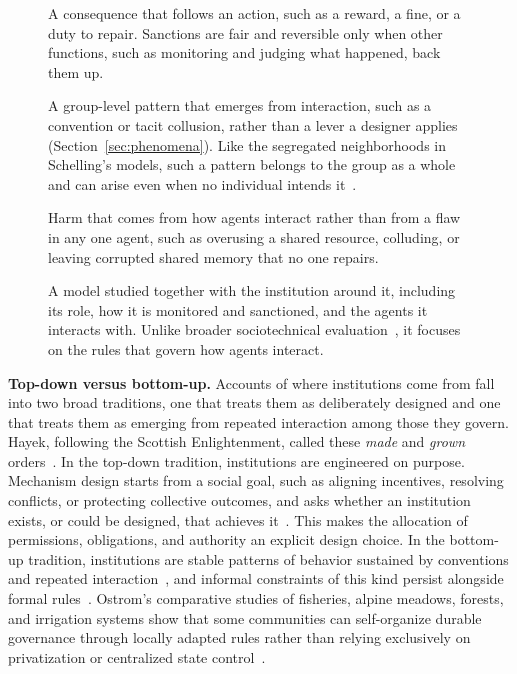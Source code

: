 \documentclass[runningheads]{llncs}
\begin{document}
\begin{figure}[!t]
{\begin{minipage}{0.95\linewidth}
\begin{description}[leftmargin=0pt, itemsep=2pt, topsep=4pt, font=\normalfont\bfseries]
\item[Sanction.] A consequence that follows an action, such as a reward, a fine, or a duty to repair. Sanctions are fair and reversible only when other functions, such as monitoring and judging what happened, back them up.
\item[Phenomenon.] A group-level pattern that emerges from interaction, such as a convention or tacit collusion, rather than a lever a designer applies (Section~\mbox{\ref{sec:phenomena}}). Like the segregated neighborhoods in Schelling's models, such a pattern belongs to the group as a whole and can arise even when no individual intends it~\mbox{\citep{schelling1978micromotives}}.
\item[Interaction failure.] Harm that comes from how agents interact rather than from a flaw in any one agent, such as overusing a shared resource, colluding, or leaving corrupted shared memory that no one repairs.
\item[Model-in-institution, model-in-context.] A model studied together with the institution around it, including its role, how it is monitored and sanctioned, and the agents it interacts with. Unlike broader sociotechnical evaluation~\mbox{\citep{weidinger2023sociotechnical}}, it focuses on the rules that govern how agents interact.
\end{description}
\end{minipage}}
\end{figure}

\textbf{Top-down versus bottom-up.} Accounts of where institutions come from fall into two broad traditions, one that treats them as deliberately designed and one that treats them as emerging from repeated interaction among those they govern. Hayek, following the Scottish Enlightenment, called these \emph{made} and \emph{grown} orders~\mbox{\citep{hayek1973law}}. In the top-down tradition, institutions are engineered on purpose. Mechanism design starts from a social goal, such as aligning incentives, resolving conflicts, or protecting collective outcomes, and asks whether an institution exists, or could be designed, that achieves it~\mbox{\citep{maskinMechanismDesignHow2008}}. This makes the allocation of permissions, obligations, and authority an explicit design choice. In the bottom-up tradition, institutions are stable patterns of behavior sustained by conventions and repeated interaction~\mbox{\citep{lewisConventionPhilosophicalStudy2008}}, and informal constraints of this kind persist alongside formal rules~\mbox{\citep{northInstitutionsInstitutionalChange1990}}.
Ostrom's comparative studies of fisheries, alpine meadows, forests, and irrigation systems show that some communities can self-organize durable governance through locally adapted rules rather than relying exclusively on privatization or centralized state control~\citep{ostromGoverningCommonsEvolution1990}.
\end{document}
